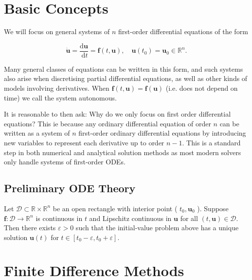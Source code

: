 \section{Basic Concepts}

\begin{definition}
  We will focus on general systems of \(n\) first-order differential equations of the form

\[
\dot{\mathbf{u}}=\frac{\mathrm{d} \mathbf{u}}{\mathrm{~d} t}=\mathbf{f}(t, \mathbf{u}), \quad \mathbf{u}\left(t_0\right)=\mathbf{u}_0 \in \mathbb{R}^n .
\]


Many general classes of equations can be written in this form, and such systems also arise when discretising partial differential equations, as well as other kinds of models involving derivatives. When \(\mathbf{f}(t, \mathbf{u})=\mathbf{f}(\mathbf{u})\) (i.e. does not depend on time) we call the system autonomous.
\end{definition}

\begin{remark}
  It is reasonable to then ask: Why do we only focus on first order differential equations? This ie because any ordinary differential equation of order \(n\) can be written as a system of \(n\) first-order ordinary differential equations by introducing new variables to represent each derivative up to order \(n-1\). This is a standard step in both numerical and analytical solution methods as most modern solvers only handle systems of first-order ODEs.
\end{remark}

\subsection{Preliminary ODE Theory}

\begin{theorem}
  Let \(\mathcal{D} \subset \mathbb{R} \times \mathbb{R}^n\) be an open rectangle with interior point ( \(t_0, \mathbf{u}_0\) ). Suppose \(\mathbf{f}: \mathcal{D} \rightarrow \mathbb{R}^n\) is continuous in \(t\) and Lipschitz continuous in \(\mathbf{u}\) for all \((t, \mathbf{u}) \in \mathcal{D}\). Then there exists \(\varepsilon>0\) such that the initial-value problem above has a unique solution \(\mathbf{u}(t)\) for \(t \in\left[t_0-\varepsilon, t_0+\varepsilon\right]\).
\end{theorem}
  
\section{Finite Difference Methods}

\begin{definition}
  
\end{definition}
